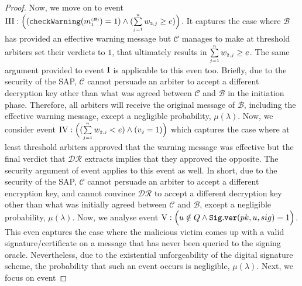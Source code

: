 \begin{proof}
 
 Now, we move on to event   $\text{\MakeUppercase{\romannumeral 3}}: \Big((\mathtt{checkWarning}(m^{\st\mathcal{(B)}}_{\st1})= 1) \wedge (\sum\limits_{\st j=1}^{\st n}w_{\st 2,j}\geq {e})\Big)$. It captures the case where $\mathcal{B}$ has provided an effective warning message but $\mathcal{C}$ manages to make at threshold arbiters  set their verdicts to $1$, that ultimately results in $\sum\limits_{\scriptscriptstyle j=1}^{\scriptscriptstyle n}w_{\scriptscriptstyle 2,j}\geq e$. The same argument provided to event $\text{\MakeUppercase{\romannumeral 1}}$ is applicable to this even too. Briefly, due to the security of the SAP, $\mathcal{C}$ cannot persuade an arbiter to accept a different decryption key other than what was agreed between $\mathcal{C}$ and $\mathcal{B}$ in the initiation phase. Therefore, all arbiters will receive the original message of $\mathcal{B}$, including the effective warning message, except a negligible probability, $\mu(\lambda)$. Now, we consider  event $\text{\MakeUppercase{\romannumeral 4}}:  \Big((\sum\limits_{\st j=1}^{\st n}w_{\st 2,j}< {e}) \wedge ({v}_{\st 2}=1)\Big)$ which captures the case where at least threshold arbiters  approved that the warning message was effective but   the final verdict that $\mathcal{DR}$ extracts implies that they approved the opposite. The security argument of  event  applies to this event as well. In short, due to the security of the SAP, $\mathcal{C}$ cannot persuade  an arbiter to accept a different encryption key, and cannot convince $\mathcal{DR}$ to accept a different decryption key other than what was initially agreed between $\mathcal{C}$ and $\mathcal{B}$, except a negligible probability, $\mu(\lambda)$. 
  Now, we analyse event  $\text{\MakeUppercase{\romannumeral 5}}: \Big(u\notin Q \wedge\mathtt{Sig.ver}( pk, u, sig) =1\Big)$. This even captures the case where the malicious victim comes up with a valid signature/certificate on a message that has never been queried to the signing oracle.  Nevertheless, due to the existential unforgeability of the digital signature scheme, the probability that such an event occurs is negligible, $\mu(\lambda)$. Next, we focus on event

\end{proof}
